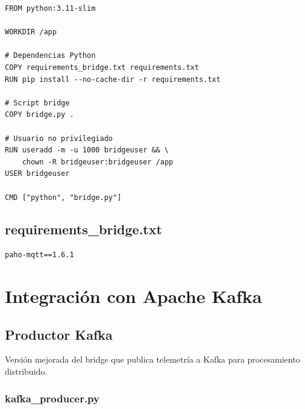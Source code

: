 \begin{verbatim}
FROM python:3.11-slim

WORKDIR /app

# Dependencias Python
COPY requirements_bridge.txt requirements.txt
RUN pip install --no-cache-dir -r requirements.txt

# Script bridge
COPY bridge.py .

# Usuario no privilegiado
RUN useradd -m -u 1000 bridgeuser && \
    chown -R bridgeuser:bridgeuser /app
USER bridgeuser

CMD ["python", "bridge.py"]
\end{verbatim}

\subsection{requirements\_bridge.txt}

\begin{verbatim}
paho-mqtt==1.6.1
\end{verbatim}

\section{Integración con Apache Kafka}

\subsection{Productor Kafka}

Versión mejorada del bridge que publica telemetría a Kafka para procesamiento distribuido.

\subsubsection{kafka\_producer.py}

